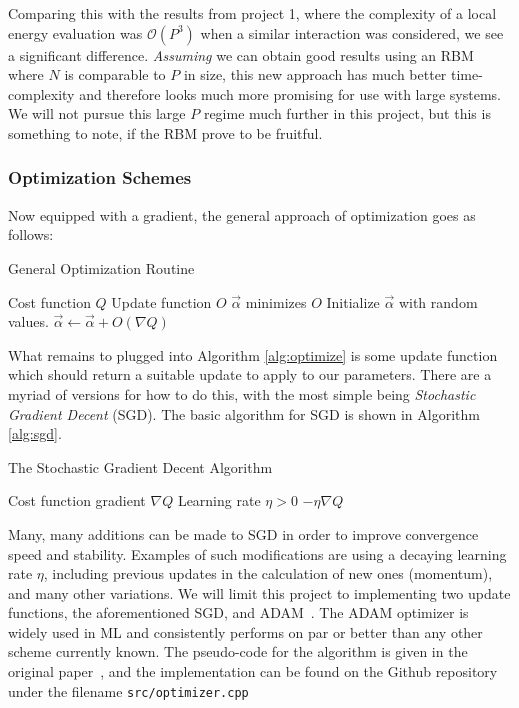 \documentclass[a4paper, 11pt]{article}
\begin{document}
\begin{multicols}{2}
    Comparing this with the results from project 1, where the complexity of a
    local energy evaluation was $\mathcal{O}(P^3)$ when a similar interaction
    was considered, we see a significant
    difference. \emph{Assuming} we can obtain good results using an RBM where $N$ is
    comparable to $P$ in size, this new approach has much better time-complexity
    and therefore looks much more promising for use with large systems. We will
    not pursue this large $P$ regime much further in this project, but this is
    something to note, if the RBM prove to be fruitful.

    \subsubsection{Optimization Schemes}

    Now equipped with a gradient, the general approach of optimization goes as
    follows:
\begin{algorithm}[H]
    \caption{General Optimization Routine}
    \label{alg:optimize}
\begin{algorithmic}
    \REQUIRE Cost function $Q$
    \REQUIRE Update function $O$
    \ENSURE $\vec \alpha$ minimizes $O$
    \STATE Initialize $\vec\alpha$ with random values.
        \STATE $\vec\alpha \leftarrow \vec\alpha + O(\nabla Q)$
    \ENDWHILE
\end{algorithmic}
\end{algorithm}

    What remains to plugged into Algorithm \ref{alg:optimize} is some update function
    which should return a suitable update to apply to our parameters. There are
    a myriad of versions for how to do this, with the most simple being
    \emph{Stochastic Gradient Decent} (SGD). The basic algorithm for SGD is
    shown in Algorithm \ref{alg:sgd}.

\begin{algorithm}[H]
    \caption{The Stochastic Gradient Decent Algorithm}
    \label{alg:sgd}
\begin{algorithmic}
    \REQUIRE Cost function gradient $\nabla Q$
    \REQUIRE Learning rate $\eta > 0$
    \RETURN $-\eta \nabla Q$
\end{algorithmic}
\end{algorithm}


    Many, many additions can be made to SGD in order to improve convergence
    speed and stability. Examples of such modifications are using a decaying
    learning rate $\eta$, including previous updates in the calculation of new
    ones (momentum), and many other variations. We will limit this project to
    implementing two update functions, the aforementioned SGD, and
    ADAM~\cite{KingmaB14}. The ADAM optimizer is widely used in ML and
    consistently performs on par or better than any other scheme currently
    known. The pseudo-code for the algorithm is given in the original
    paper~\cite{KingmaB14}, and the implementation can be found on the Github
    repository under the filename \texttt{src/optimizer.cpp}
    

\end{multicols}
\end{document}
